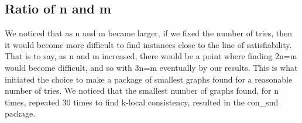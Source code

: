 \subsection{Ratio of n and m}
We noticed that as n and m became larger, if we fixed the number of tries, then it would become more difficult to find instances close to the line of satisfiability. That is to say, as n and m increased, there would be a point where finding 2n=m would become difficult, and so with 3n=m eventually by our results. This is what initiated the choice to make a package of smallest graphs found for a reasonable number of tries. We noticed that the smallest number of graphs found, for n times, repeated 30 times to find k-local consistency, resulted in the con\_sml package.



